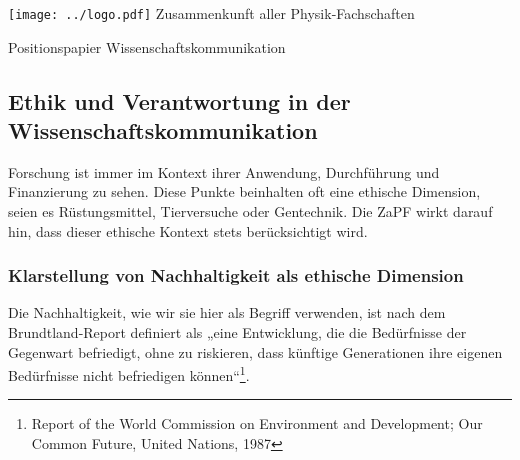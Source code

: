 \documentclass[DIV=calc]{scrartcl}
\begin{document}
\hspace{0.87\textwidth}
\begin{minipage}{120pt}
	\vspace{-1.8cm}
	\texttt{[image: ../logo.pdf]}
	\centering
	\small Zusammenkunft aller Physik-Fachschaften
\end{minipage}

\begin{center}
  \huge{Positionspapier Wissenschaftskommunikation}\vspace{.25\baselineskip}\\
  \normalsize
\end{center}
\vspace{1cm}





\subsection*{Ethik und Verantwortung in der Wissenschaftskommunikation}

Forschung ist immer im Kontext ihrer Anwendung, Durchführung und Finanzierung zu sehen. Diese Punkte beinhalten oft eine ethische Dimension, seien es Rüstungsmittel, Tierversuche oder Gentechnik. Die ZaPF wirkt darauf hin, dass dieser ethische Kontext stets berücksichtigt wird.

\subsubsection*{Klarstellung von Nachhaltigkeit als ethische Dimension}

Die Nachhaltigkeit, wie wir sie hier als Begriff verwenden, ist nach dem Brundtland-Report definiert als „eine Entwicklung, die die Bedürfnisse der Gegenwart befriedigt, ohne zu riskieren, dass künftige Generationen ihre eigenen Bedürfnisse nicht befriedigen können“\footnote{Report of the World Commission on Environment and Development; Our Common Future, United Nations, 1987}.
\end{document}
